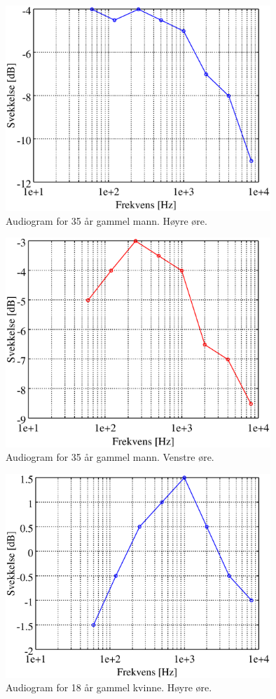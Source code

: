 \documentclass[norsk, twocolumn,letterpaper,11pt,fleqn]{extarticle}
\begin{document}
\begin{figure}[h!]
	\centering
	\includegraphics[width=100mm]{rightear35.eps}
	\caption[]{Audiogram for 35 år gammel mann. Høyre øre.}
	\label{fig:8}
\end{figure}
\begin{figure}[h!]
	\centering
	\includegraphics[width=100mm]{leftear35.eps}
	\caption[]{Audiogram for 35 år gammel mann. Venstre øre.}
	\label{fig:9}
\end{figure}
\begin{figure}[h!]
	\centering
	\includegraphics[width=100mm]{rightear18.eps}
	\caption[]{Audiogram for 18 år gammel kvinne. Høyre øre.}
	\label{fig:10}
\end{figure}
\end{document}
